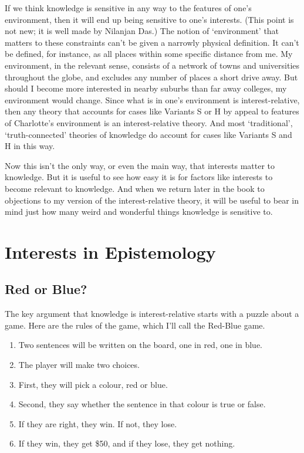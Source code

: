 \documentclass[11pt,]{book}
\providecommand{\tightlist}{%
  \setlength{\itemsep}{0pt}\setlength{\parskip}{0pt}}
\begin{document}
If we think knowledge is sensitive in any way to the features of one's environment, then it will end up being sensitive to one's interests. (This point is not new; it is well made by Nilanjan Das.) The notion of `environment' that matters to these constraints can't be given a narrowly physical definition. It can't be defined, for instance, as all places within some specific distance from me. My environment, in the relevant sense, consists of a network of towns and universities throughout the globe, and excludes any number of places a short drive away. But should I become more interested in nearby suburbs than far away colleges, my environment would change. Since what is in one's environment is interest-relative, then any theory that accounts for cases like Variants S or H by appeal to features of Charlotte's environment is an interest-relative theory. And most `traditional', `truth-connected' theories of knowledge do account for cases like Variants S and H in this way.

Now this isn't the only way, or even the main way, that interests matter to knowledge. But it is useful to see how easy it is for factors like interests to become relevant to knowledge. And when we return later in the book to objections to my version of the interest-relative theory, it will be useful to bear in mind just how many weird and wonderful things knowledge is sensitive to.

\hypertarget{interests}{%
\chapter{Interests in Epistemology}\label{interests}}

\hypertarget{redblue}{%
\section{Red or Blue?}\label{redblue}}

The key argument that knowledge is interest-relative starts with a puzzle about a game. Here are the rules of the game, which I'll call the Red-Blue game.

\begin{enumerate}
\def\labelenumi{\arabic{enumi}.}
\tightlist
\item
  Two sentences will be written on the board, one in red, one in blue.
\item
  The player will make two choices.
\item
  First, they will pick a colour, red or blue.
\item
  Second, they say whether the sentence in that colour is true or
  false.
\item
  If they are right, they win. If not, they lose.
\item
  If they win, they get \$50, and if they lose, they get nothing.
\end{enumerate}
\end{document}
